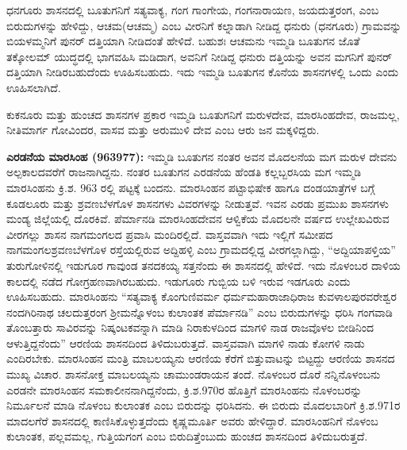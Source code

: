 ಧನಗೂರು ಶಾಸನದಲ್ಲಿ ಬೂತುಗನಿಗೆ ಸತ್ಯವಾಕ್ಯ, ಗಂಗ ಗಾಂಗೇಯ, ಗಂಗನಾರಾಯಣ, ಜಯದುತ್ತರಂಗ, ಎಂಬ ಬಿರುದುಗಳನ್ನು ಹೇಳಿದ್ದು, ಆಚಮ(ಆಚಮ್ಮ) ಎಂಬ ವೀರನಿಗೆ ಕಲ್ನಾಡಾಗಿ ನೀಡಿದ್ದ ಧನುರು (ಧನಗೂರು) ಗ್ರಾಮವನ್ನು ಬಿಯಳಮ್ಮನಿಗೆ ಪುನರ್​ ದತ್ತಿಯಾಗಿ ನೀಡಿದಂತೆ ಹೇಳಿದೆ. ಬಹುಶಃ ಆಚಮನು ಇಮ್ಮಡಿ ಬೂತುಗನ ಜೊತೆ ತಕ್ಕೋಲಮ್ ಯುದ್ಧದಲ್ಲಿ ಭಾಗವಹಿಸಿ ಮಡಿದಾಗ, ಅವನಿಗೆ ನೀಡಿದ್ದ ಧನುರು ದತ್ತಿಯನ್ನು ಅವನ ಮಗನಿಗೆ ಪುನರ್​ದತ್ತಿಯಾಗಿ ನೀಡಿರಬಹು\-ದೆಂದು ಊಹಿಸಬಹುದು. ಇದು ಇಮ್ಮಡಿ ಬೂತುಗನ ಕೊನೆಯ ಶಾಸನಗಳಲ್ಲಿ ಒಂದು ಎಂದು ಊಹಿಸಲಾಗಿದೆ.

ಕುಕನೂರು ಮತ್ತು ಹುಂಚದ ಶಾಸನಗಳ ಪ್ರಕಾರ ಇಮ್ಮಡಿ ಬೂತುಗನಿಗೆ ಮರುಳದೇವ, ಮಾರಸಿಂಹದೇವ, ರಾಜಮಲ್ಲ, ನೀತಿಮಾರ್ಗ ಗೋವಿಂದರ, ವಾಸವ ಮತ್ತು ಅರುಮುಳಿ ದೇವ ಎಂಬ ಆರು ಜನ ಮಕ್ಕಳಿದ್ದರು.

\textbf{ ಎರಡನೆಯ ಮಾರಸಿಂಹ (963\general{\enginline{-}}977):} ಇಮ್ಮಡಿ ಬೂತುಗನ ನಂತರ ಅವನ ಮೊದಲನೆಯ ಮಗ ಮರುಳ ದೇವನು ಅಲ್ಪಕಾಲದವರೆಗೆ ರಾಜನಾಗಿದ್ದನು. ನಂತರ ಬೂತುಗನ ಎರಡನೆಯ ಹೆಂಡತಿ ಕಲ್ಲಬ್ಬರಸಿಯ ಮಗ ಇಮ್ಮಡಿ ಮಾರಸಿಂಹನು ಕ್ರಿ.ಶ. 963 ರಲ್ಲಿ ಪಟ್ಟಕ್ಕೆ ಬಂದನು. ಮಾರಸಿಂಹನ ಪಟ್ಟಾಭಿಷೇಕ ಹಾಗೂ ದಂಡಯಾತ್ರೆಗಳ ಬಗ್ಗೆ ಕೂಡಲೂರು ಮತ್ತು ಶ್ರವಣಬೆಳಗೊಳ ಶಾಸನಗಳು ವಿವರಗಳನ್ನು ನೀಡುತ್ತವೆ. ಇವನ ಎರಡು ಪ್ರಮುಖ ಶಾಸನಗಳು ಮಂಡ್ಯ ಜಿಲ್ಲೆಯಲ್ಲಿ ದೊರಕಿವೆ. ಪೆರ್ಮಾನಡಿ ಮಾರಸಿಂಹದೇವನ ಆಳ್ವಿಕೆಯ ಮೊದಲನೇ ವರ್ಷದ ಉಲ್ಲೇಖವಿರುವ ವೀರಗಲ್ಲು ಶಾಸನ ನಾಗಮಂಗಲದ ಪ್ರವಾಸಿ ಮಂದಿರಲ್ಲಿದೆ. ವಾಸ್ತವವಾಗಿ ಇದು ಇಲ್ಲಿಗೆ ಸಮೀಪದ ನಾಗಮಂಗಲ\enginline{-}ಶ್ರವಣಬೆಳಗೊಳ ರಸ್ತೆಯಲ್ಲಿರುವ ಅದ್ದಿಹಳ್ಳಿ ಎಂಬ ಗ್ರಾಮದಲ್ಲಿದ್ದ ವೀರಗಲ್ಲಾಗಿದ್ದು, “ಅದ್ದಿಯಾಪಳ್ತಿಯ” ತುರುಗೋಳಿನಲ್ಲಿ ಇಡುಗೂರ ಗಾವುಂಡ ತನದಕಯ್ಯ ಸತ್ತನೆಂದು ಈ ಶಾಸನದಲ್ಲಿ ಹೇಳಿದೆ. ಇದು ನೊಳಂಬರ ದಾಳಿಯ ಕಾಲದಲ್ಲಿ ನಡೆದ ಗೋಗ್ರಹಣವಾಗಿರಬಹುದು. ಇಡುಗೂರು ಗುಬ್ಬಿಯ ಬಳಿ ಇರುವ ಇಡಗೂರು ಎಂದು ಊಹಿಸಬಹುದು. ಮಾರಸಿಂಹನು “ಸತ್ಯವಾಕ್ಯ ಕೊಂಗುಣಿವರ್ಮ ಧರ್ಮಮಹಾರಾಜಾಧಿರಾಜ ಕುವಳಾಲಪುರವರೇಶ್ವರ ನಂದಗಿರಿನಾಥ ಚಲದುತ್ತರಂಗ ಶ‍್ರೀಮನ್ನೊಳಂಬ ಕುಲಾಂತಕ ಪೆರ್ಮಾನಡಿ” ಎಂಬ ಬಿರುದುಗಳನ್ನು ಧರಿಸಿ ಗಂಗವಾಡಿ ತೊಂಬತ್ತಾರು ಸಾವಿರವನ್ನು ನಿಷ್ಕಂಟಕವನ್ನಾಗಿ ಮಾಡಿ ನಿರಾಕುಳದಿಂದ ಮಾಗಳಿ ನಾಡ ರಾಜವೊಳಲ ಬೀಡಿನಿಂದ ಆಳುತ್ತಿದ್ದನೆಂದು” ಆರಣಿಯ ಶಾಸನದಿಂದ ತಿಳಿದುಬರುತ್ತದೆ. ವಾಸ್ತವವಾಗಿ ಮಾಗಳಿ ನಾಡು ಕೋಗಳಿ ನಾಡು ಎಂದಿರಬೇಕು. ಮಾರಸಿಂಹನ ಮಂತ್ರಿ ಮಾಬಲಯ್ಯನು ಆರಣಿಯ ಕೆರೆಗೆ ಬಿತ್ತುವಾಟನ್ನು ಬಿಟ್ಟದ್ದು ಆರಣಿಯ ಶಾಸನದ ಮುಖ್ಯ ವಿಚಾರ. ಶಾಸನೋಕ್ತ ಮಾಬಲಯ್ಯನು ಚಾಮುಂಡರಾಯನ ತಂದೆ. ನೊಳಂಬರ ದೊರೆ ನನ್ನಿನೊಳಂಬನು ಎರಡನೇ ಮಾರಸಿಂಹನ ಸಮಕಾಲೀನನಾಗಿದ್ದನೆಂದು, ಕ್ರಿ.ಶ.970ರ ಹೊತ್ತಿಗೆ ಮಾರಸಿಂಹನು ನೊಳಂಬರನ್ನು ನಿರ್ಮೂಲನೆ ಮಾಡಿ ನೊಳಂಬ ಕುಲಾಂತಕ ಎಂಬ ಬಿರುದನ್ನು ಧರಿಸಿದನು. ಈ ಬಿರುದು ಮೊದಲಬಾರಿಗೆ ಕ್ರಿ.ಶ.971ರ ಮಾದಲಗೆರೆ ಶಾಸನದಲ್ಲಿ ಕಾಣಿಸಿಕೊಳ್ಳುತ್ತದೆಂದು ಕೃಷ್ಣಮೂರ್ತಿ ಅವರು ಹೇಳಿದ್ದಾರೆ. ಮಾರಸಿಂಹನಿಗೆ ನೊಳಂಬ ಕುಲಾಂತಕ, ಪಲ್ಲವಮಲ್ಲ, ಗುತ್ತಿಯಗಂಗ ಎಂಬ ಬಿರುದಿತ್ತೆಂಬುದು ಹುಂಚದ ಶಾಸನದಿಂದ ತಿಳಿದುಬರುತ್ತದೆ.


